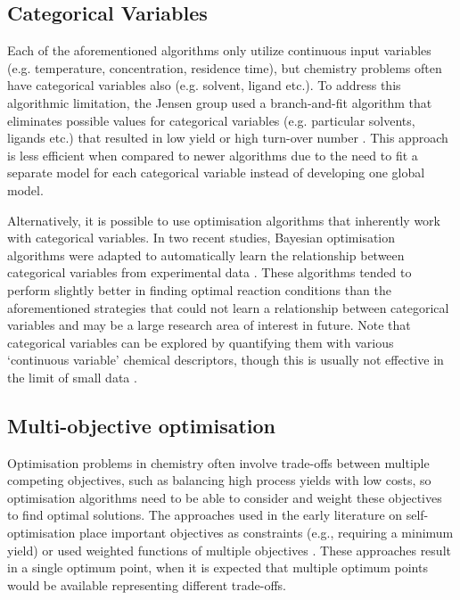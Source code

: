 \subsection{Categorical Variables}
Each of the aforementioned algorithms only utilize continuous input variables (e.g. temperature, concentration, residence time), but chemistry problems often have categorical variables also (e.g. solvent, ligand etc.). To address this algorithmic limitation, the Jensen group used a branch-and-fit algorithm that eliminates possible values for categorical variables (e.g. particular solvents, ligands etc.) that resulted in low yield or high turn-over number \cite{Reizman2016a, Baumgartner2018}. This approach is less efficient when compared to newer algorithms due to the need to fit a separate model for each categorical variable instead of developing one global model.

Alternatively, it is possible to use optimisation algorithms that inherently work with categorical variables. In two recent studies, Bayesian optimisation algorithms were adapted to automatically learn the relationship between categorical variables from experimental data \cite{Manson2021, Hase2021}. These algorithms tended to perform slightly better in finding optimal reaction conditions than the aforementioned strategies that could not learn a relationship between categorical variables and may be a large research area of interest in future. Note that categorical variables can be explored by quantifying them with various ‘continuous variable’ chemical descriptors, though this is usually not effective in the limit of small data \cite{Pomberger2023}.

\subsection{Multi-objective optimisation}
Optimisation problems in chemistry often involve trade-offs between multiple competing objectives, such as balancing high process yields with low costs, so optimisation algorithms need to be able to consider and weight these objectives to find optimal solutions. The approaches used in the early literature on self-optimisation place important objectives as constraints (e.g., requiring a minimum yield) \cite{Reizman2015b, Reizman2016a, Reizman2016b, Baumgartner2018} or used weighted functions of multiple objectives \cite{Krishnadasan2007, Fitzpatrick2016, Hase2018b}. These approaches result in a single optimum point, when it is expected that multiple optimum points would be available representing different trade-offs.

